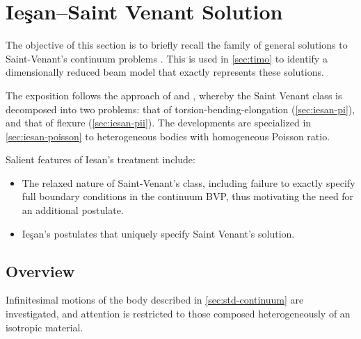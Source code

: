 
\chapter{Ie\c{s}an--Saint Venant Solution}\label{sec:sv}

The objective of this section is to briefly recall the family of general solutions to Saint-Venant's continuum problems \citep{iesan1987saintvenants,synge1945problem}. 
This is used in \cref{sec:timo} to identify a dimensionally reduced beam model that exactly represents these solutions. 


The exposition follows the approach of \cite{iesan1986saintvenants} and \cite{iesan1976saintvenantsb}, whereby the Saint Venant class is decomposed into two problems: that of torsion-bending-elongation (\cref{sec:iesan-pi}), and that of flexure (\cref{sec:iesan-pii}).
The developments are specialized in \cref{sec:iesan-poisson} to heterogeneous bodies with homogeneous Poisson ratio.

\begin{Quote}

Salient features of Iesan's treatment include:
\begin{itemize}
    \item The relaxed nature of Saint-Venant's class, including failure to exactly specify full boundary conditions in the continuum BVP, thus motivating the need for an additional postulate.
    \item Ie\c{s}an's postulates that uniquely specify Saint Venant's solution.
\end{itemize}
\end{Quote}

\section{Overview}
Infinitesimal motions of the body described in \cref{sec:std-continuum} are investigated, and attention is restricted to those composed heterogeneously of an isotropic material. 

